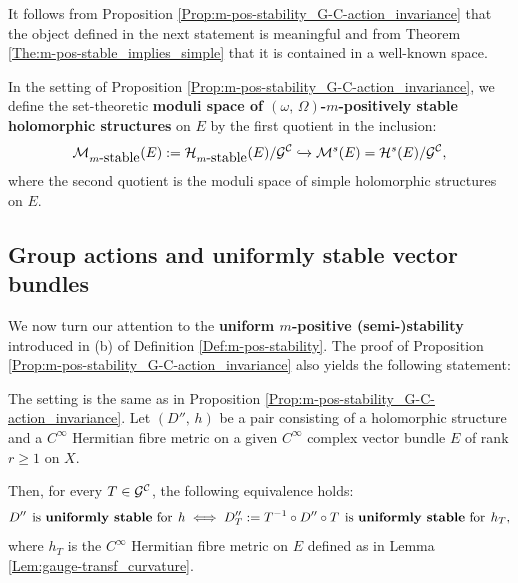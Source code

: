 \documentclass[12pt]{article}
\begin{document}
It follows from Proposition \ref{Prop:m-pos-stability_G-C-action_invariance} that the object defined in the next statement is meaningful and from Theorem \ref{The:m-pos-stable_implies_simple} that it is contained in a well-known space.

\begin{Cor-Def}\label{Cor-def:moduli-stable_set} In the setting of Proposition \ref{Prop:m-pos-stability_G-C-action_invariance}, we define the set-theoretic {\bf moduli space of $(\omega,\,\Omega)$-$m$-positively stable holomorphic structures} on $E$ by the first quotient in the inclusion: \begin{eqnarray}\label{eqn:moduli-stable_set}{\cal M}_{m\mbox{-stable}}(E):={\cal H}_{m\mbox{-stable}}(E)/{\cal G}^{\cal C}\xhookrightarrow { } {\cal M}^s(E)={\cal H}^s(E)/{\cal G}^{\cal C},\end{eqnarray} where the second quotient is the moduli space of simple holomorphic structures on $E$.

\end{Cor-Def}


\subsection{Group actions and uniformly stable vector bundles}\label{subsection:groups_uniformly-stable}

We now turn our attention to the {\bf uniform $m$-positive (semi-)stability} introduced in (b) of Definition \ref{Def:m-pos-stability}. The proof of Proposition \ref{Prop:m-pos-stability_G-C-action_invariance} also yields the following statement:

\begin{Cor}\label{Cor:uniform-stab_G-C-action_invariance} The setting is the same as in Proposition \ref{Prop:m-pos-stability_G-C-action_invariance}. Let $(D'',\,h)$ be a pair consisting of a holomorphic structure and a $C^\infty$ Hermitian fibre metric on a given $C^\infty$ complex vector bundle $E$ of rank $r\geq 1$ on $X$.

  Then, for every $T\in{\cal G}^{\cal C}$, the following equivalence holds: \begin{eqnarray*}D'' \hspace{1ex} \mbox{is {\bf uniformly stable} for}\hspace{1ex} h \iff  D''_T:=T^{-1}\circ D''\circ T \hspace{1ex} \mbox{is {\bf uniformly stable} for}\hspace{1ex} h_T,\end{eqnarray*} where $h_T$ is the $C^\infty$ Hermitian fibre metric on $E$ defined as in Lemma \ref{Lem:gauge-transf_curvature}.



\end{Cor}
\end{document}
